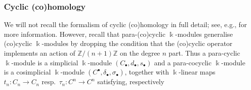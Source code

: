 \documentclass[reqno, a4paper, 10pt]{amsart}
\numberwithin{equation}{section}
\theoremstyle{plain}
\theoremstyle{definition}
\theoremstyle{remark}
\begin{document}
\subsubsection{Cyclic (co)homology}
\label{almeria}
We will not recall the formalism of cyclic (co)homology in
full detail; see, e.g., \cite{FeiTsy:AKT, Lod:CH} for more information. However,
recall that 
para-(co)cyclic ${{\Bbbk}}$-modules generalise 
(co)cyclic ${{\Bbbk}}$-modules by dropping the
condition that the (co)cyclic operator
implements an action of
$\mathbb{Z}/(n+1)\mathbb{Z}$ on the
degree $n$ part. Thus a para-cyclic
${{\Bbbk}}$-module is a simplicial
${{\Bbbk}}$-module
$(C_{{\scriptscriptstyle{\bullet}}},d_{{\scriptscriptstyle{\bullet}}},s_{{\scriptscriptstyle{\bullet}}})$ 
and a para-cocyclic ${{\Bbbk}}$-module is a
cosimplicial ${{\Bbbk}}$-module
$(C^{{\scriptscriptstyle{\bullet}}},\delta_{{\scriptscriptstyle{\bullet}}},\sigma_{{\scriptscriptstyle{\bullet}}})$,
together with ${{\Bbbk}}$-linear maps 
$t_n : C_n \rightarrow C_n$ resp.~$\tau_n : C^n \rightarrow C^n$
satisfying, respectively
\end{document}
